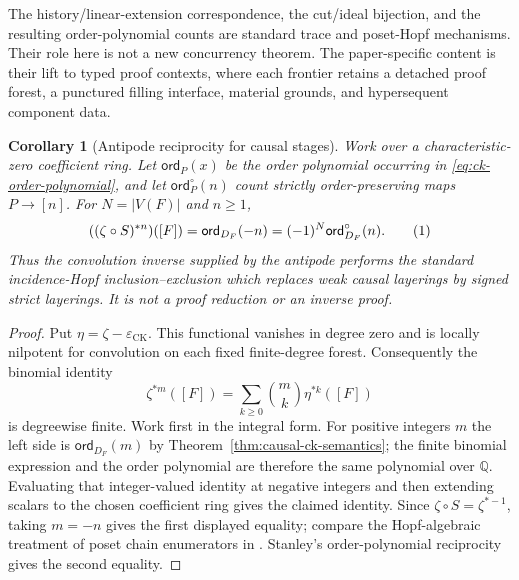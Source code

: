 \documentclass[10pt,a4paper]{article}
\theoremstyle{plain}
\newtheorem{corollary}[theorem]{Corollary}
\theoremstyle{definition}
\theoremstyle{remark}
\newcommand{\epsCK}{\varepsilon_{\mathrm{CK}}}
\newcommand{\eqtag}{\refstepcounter{equation}\tag{\theequation}}
\begin{document}
The history/linear-extension correspondence, the cut/ideal bijection, and
the resulting order-polynomial counts are standard trace and poset-Hopf
mechanisms.  Their role here is not a new concurrency theorem.  The
paper-specific content is their lift to typed proof contexts, where each
frontier retains a detached proof forest, a punctured filling interface,
material grounds, and hypersequent component data.

\begin{corollary}[Antipode reciprocity for causal stages]
\label{cor:causal-antipode-reciprocity}
Work over a characteristic-zero coefficient ring.  Let
\(\mathsf{ord}_{P}(x)\) be the order polynomial occurring in
\eqref{eq:ck-order-polynomial}, and let
\(\mathsf{ord}^{\circ}_{P}(n)\) count strictly order-preserving maps
\(P\to[n]\).  For \(N=|V(F)|\) and \(n\ge1\),
\[
 ((\zeta\circ S)^{*n})([F])
   =\mathsf{ord}_{D_F}(-n)
   =(-1)^N\mathsf{ord}^{\circ}_{D_F}(n).
\eqtag\label{eq:causal-antipode-reciprocity}
\]
Thus the convolution inverse supplied by the antipode performs the standard
incidence-Hopf inclusion--exclusion which replaces weak causal layerings by
signed strict layerings.  It is not a proof reduction or an inverse proof.
\end{corollary}

\begin{proof}
Put \(\eta=\zeta-\epsCK\).  This functional vanishes in degree zero and is
locally nilpotent for convolution on each fixed finite-degree forest.
Consequently the binomial identity
\[
 \zeta^{*m}([F])
   =\sum_{k\ge0}\binom{m}{k}\eta^{*k}([F])
\]
is degreewise finite.  Work first in the integral form.  For positive
integers \(m\) the left side is \(\mathsf{ord}_{D_F}(m)\) by
Theorem~\ref{thm:causal-ck-semantics}; the finite binomial expression and
the order polynomial are therefore the same polynomial over \(\mathbb Q\).
Evaluating that integer-valued identity at negative integers and then
extending scalars to the chosen coefficient ring gives the claimed
identity.  Since
\(\zeta\circ S=\zeta^{*-1}\), taking \(m=-n\) gives the first displayed
equality; compare the Hopf-algebraic treatment of poset chain enumerators
in \cite{ehrenborg1996}.  Stanley's order-polynomial reciprocity
\cite{stanley1972} gives the second equality.
\end{proof}
\end{document}
